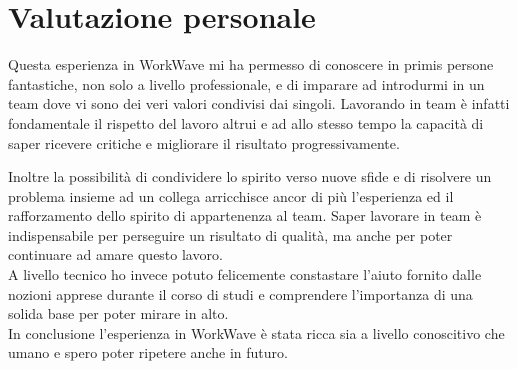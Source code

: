 \section{Valutazione personale}

Questa esperienza in WorkWave mi ha permesso di conoscere in primis persone fantastiche, non solo a livello professionale, e di imparare ad introdurmi in un team dove vi sono dei veri valori condivisi dai singoli. Lavorando in team è infatti fondamentale il rispetto del lavoro altrui e ad allo stesso tempo la capacità di saper ricevere critiche e migliorare il risultato progressivamente.

Inoltre la possibilità di condividere lo spirito verso nuove sfide e di risolvere un problema insieme ad un collega arricchisce ancor di più l'esperienza ed il rafforzamento dello spirito di appartenenza al team. Saper lavorare in team è indispensabile per perseguire un risultato di qualità, ma anche per poter continuare ad amare questo lavoro. \\

A livello tecnico ho invece potuto felicemente constastare l'aiuto fornito dalle nozioni apprese durante il corso di studi e comprendere l'importanza di una solida base per poter mirare in alto. \\

In conclusione l'esperienza in WorkWave è stata ricca sia a livello conoscitivo che umano e spero poter ripetere anche in futuro.
